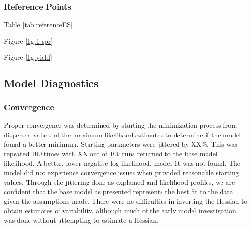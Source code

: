 \documentclass[11pt,
  english,
  a4paper,
]{article}
\begin{document}
\hypertarget{reference-points}{%
\subsubsection{Reference Points}\label{reference-points}}

\leavevmode\tagmcend\tagstructend


Table \ref{tab:referenceES}

\leavevmode\tagmcend\tagstructend\par


Figure \ref{fig:1-spr}

\leavevmode\tagmcend\tagstructend\par


Figure \ref{fig:yield}

\leavevmode\tagmcend\tagstructend\par


\hypertarget{model-diagnostics}{%
\subsection{Model Diagnostics}\label{model-diagnostics}}

\leavevmode\tagmcend\tagstructend


\hypertarget{convergence}{%
\subsubsection{Convergence}\label{convergence}}

\leavevmode\tagmcend\tagstructend


Proper convergence was determined by starting the minimization process from dispersed values of the maximum likelihood estimates to determine if the model found a better minimum. Starting parameters were jittered by XX\%. This was repeated 100 times with XX out of 100 runs returned to the base model likelihood. A better, lower negative log-likelihood, model fit was not found. The model did not experience convergence issues when provided reasonable starting values. Through the jittering done as explained and likelihood profiles, we are confident that the base model as presented represents the best fit to the data given the assumptions made. There were no difficulties in inverting the Hessian to obtain estimates of variability, although much of the early model investigation was done without attempting to estimate a Hessian.
\end{document}
